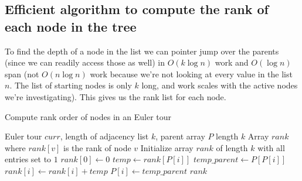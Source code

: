 \documentclass[11pt]{article}
\theoremstyle{definition}
\begin{document}
\subsection{Efficient algorithm to compute the rank of each node in the tree}

To find the depth of a node in the list we can pointer jump over the parents (since we can readily access those as well) in $O(k \log n)$ work and $O(\log n)$ span (not $O(n \log n)$ work because we're not looking at every value in the list $n$. The list of starting nodes is only $k$ long, and work scales with the active nodes we're investigating). This gives us the rank list for each node.

\begin{algorithm}[H]
\caption{Compute rank order of nodes in an Euler tour}
\begin{algorithmic}[1]
\REQUIRE Euler tour $curr$, length of adjacency list $k$, parent array $P$ length $k$
\ENSURE Array $rank$ where $rank[v]$ is the rank of node $v$
\STATE Initialize array $rank$ of length $k$ with all entries set to $1$
\STATE $rank[0] \gets 0$
        \STATE $temp \gets rank[P[i]]$
        \STATE $temp\_parent \gets P[P[i]]$
    \ENDFOR
        \STATE $rank[i] \gets rank[i] + temp$
        \STATE $P[i] \gets temp\_parent$
    \ENDFOR
\ENDFOR
\RETURN $rank$
\end{algorithmic}
\end{algorithm}
\end{document}
